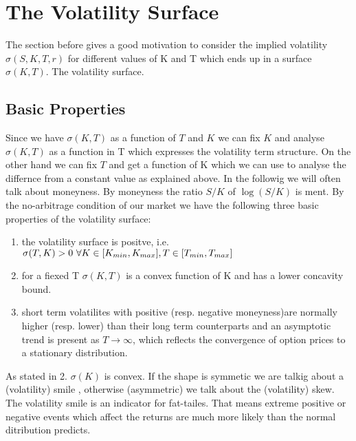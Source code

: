 \section{The Volatility Surface}
The section before gives a good motivation to consider the implied volatility $\sigma(S,K,T,r)$ for different values of K and T which ends up in a surface $\sigma(K,T)$. The volatility surface.

\subsection{Basic Properties}
Since we have $\sigma(K,T)$ as a function of $T$ and $K$ we can fix $K$ and analyse $\sigma(K,T)$ as a function in T which expresses the volatility term structure. On the other hand we can fix $T$ and get a function of K which we can use to analyse the differnce from a constant value as explained above. In the followig we will often talk about moneyness. By moneyness the ratio $S/K$ of $\log(S/K)$ is ment.
By the no-arbitrage condition of our market we have the following three basic properties of the volatility surface:
\begin{enumerate}
\item the volatility surface is positve, i.e. $\sigma(T,K)>0 ~\forall K \in [K_{min},K_{max}],\\T \in [T_{min},T_{max}]$
\item for a fiexed T $\sigma(K,T)$ is a convex function of K and has a lower concavity bound.
\item short term volatilites with positive (resp. negative moneyness)are normally higher (resp. lower) than their long term counterparts and an asymptotic trend is present as $T \rightarrow \infty$, which reflects the convergence of option prices to a stationary distribution.
\end{enumerate}
As stated in 2. $\sigma(K)$ is convex. If the shape is symmetic we are talkig about a (volatility) smile , otherwise (asymmetric) we talk about the (volatility) skew.\\
The volatility smile is an indicator for fat-tailes. That means extreme positive or negative events which affect the returns are much more likely than the normal ditribution predicts.
